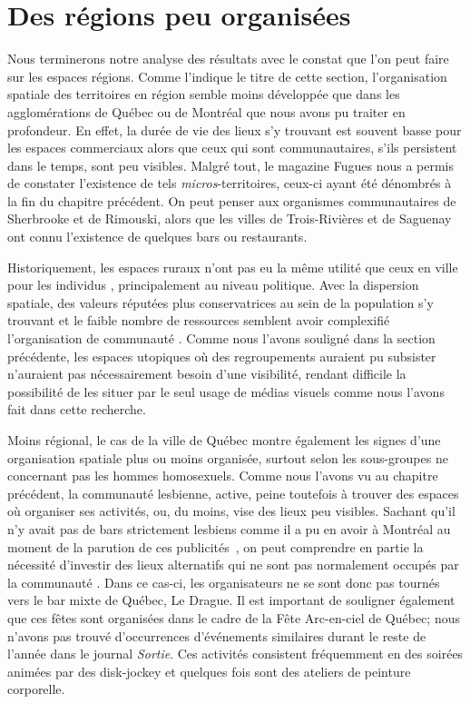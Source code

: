 \section{Des régions peu organisées}
\label{sec:des_regions_peu_organisees}
Nous terminerons notre analyse des résultats avec le constat que l'on peut faire sur les espaces régions.
Comme l'indique le titre de cette section, l'organisation spatiale des territoires en région semble moins développée que dans les agglomérations de Québec ou de Montréal que nous avons pu traiter en profondeur.
En effet, la durée de vie des lieux \lgbt{} s'y trouvant est souvent basse pour les espaces commerciaux alors que ceux qui sont communautaires, s'ils persistent dans le temps, sont peu visibles.
Malgré tout, le magazine Fugues nous a permis de constater l'existence de tels \emph{micros}-territoires, ceux-ci ayant été dénombrés à la fin du chapitre précédent.
On peut penser aux organismes communautaires de Sherbrooke et de Rimouski, alors que les villes de Trois-Rivières et de Saguenay ont connu l'existence de quelques bars ou restaurants.

Historiquement, les espaces ruraux n'ont pas eu la même utilité que ceux en ville pour les individus \lgbt{}, principalement au niveau politique.
Avec la dispersion spatiale, des valeurs réputées plus conservatrices au sein de la population s'y trouvant et le faible nombre de ressources semblent avoir complexifié l'organisation de communauté \lgbt{}.
Comme nous l'avons souligné dans la section précédente, les espaces utopiques où des regroupements \lgbt{} auraient pu subsister n'auraient pas nécessairement besoin d'une visibilité, rendant difficile la possibilité de les situer par le seul usage de médias visuels comme nous l'avons fait dans cette recherche.

Moins régional, le cas de la ville de Québec montre également les signes d'une organisation spatiale plus ou moins organisée, surtout selon les sous-groupes ne concernant pas les hommes homosexuels.
Comme nous l'avons vu au chapitre précédent, la communauté lesbienne, active, peine toutefois à trouver des espaces où organiser ses activités, ou, du moins, vise des lieux peu visibles.
Sachant qu'il n'y avait pas de bars strictement lesbiens comme il a pu en avoir à Montréal au moment de la parution de ces publicités~\citep{Podmore2006}, on peut comprendre en partie la nécessité d'investir des lieux alternatifs qui ne sont pas normalement occupés par la communauté \lgbt{}.
Dans ce cas-ci, les organisateurs ne se sont donc pas tournés vers le bar mixte de Québec, Le Drague.
Il est important de souligner également que ces fêtes sont organisées dans le cadre de la Fête Arc-en-ciel de Québec; nous n'avons pas trouvé d'occurrences d'événements similaires durant le reste de l'année dans le journal \emph{Sortie}.
Ces activités consistent fréquemment en des soirées animées par des disk-jockey et quelques fois sont des ateliers de peinture corporelle.
